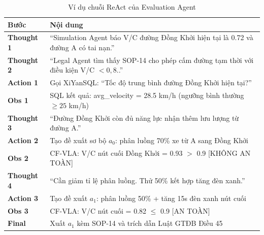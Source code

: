 \begin{table}[H]
\centering
\caption{Ví dụ chuỗi ReAct của Evaluation Agent}
\label{tab:react_example}
\renewcommand{\arraystretch}{1.5}
\begin{tabular}{>{\bfseries\centering}p{1.5cm} p{10.5cm}}
\toprule
\textbf{Bước} & \textbf{Nội dung} \\
\midrule
Thought 1 & ``Simulation Agent báo V/C đường Đồng Khởi hiện tại là 0.72 và đường A có tai nạn.'' \\
\rowcolor{rowgray}
Thought 2 & ``Legal Agent tìm thấy SOP-14 cho phép cấm đường tạm thời với điều kiện V/C $< 0{,}8$..'' \\
Action 1 & Gọi XiYanSQL: ``Tốc độ trung bình đường Đồng Khởi hiện tại?'' \\
\rowcolor{rowgray}
Obs 1 & SQL kết quả: avg\_velocity = 28.5 km/h (ngưỡng bình thường $\geq 25$ km/h) \\
Thought 3 & ``Đường Đồng Khởi còn đủ năng lực nhận thêm lưu lượng từ đường A.'' \\
\rowcolor{rowgray}
Action 2 & Tạo đề xuất sơ bộ $a_0$: phân luồng 70\% xe từ A sang Đồng Khởi \\
Obs 2 & CF-VLA: V/C nút cuối Đồng Khởi = 0.93 $>$ 0.9 [KHÔNG AN TOÀN] \\
\rowcolor{rowgray}
Thought 4 & ``Cần giảm tỉ lệ phân luồng. Thử 50\% kết hợp tăng đèn xanh.'' \\
Action 3 & Tạo đề xuất $a_1$: phân luồng 50\% + tăng 15s đèn xanh nút cuối \\
\rowcolor{rowgray}
Obs 3 & CF-VLA: V/C nút cuối = 0.82 $\leq$ 0.9 [AN TOÀN] \\
Final & Xuất $a_1$ kèm SOP-14 và trích dẫn Luật GTĐB Điều 45 \\
\bottomrule
\end{tabular}
\end{table}
